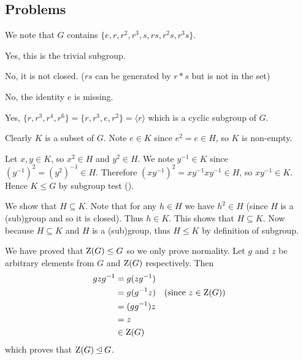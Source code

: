 \subsection*{Problems}
\begin{questions}
    \item We note that $G$ contains $\{e, r, r^2, r^3, s, rs, r^2s, r^3s\}$.
    \begin{partquestions}{\alph*}
        \item Yes, this is the trivial subgroup.
        \item No, it is not closed. ($rs$ can be generated by $r \ast s$ but is not in the set)
        \item No, the identity $e$ is missing.
        \item Yes, $\{r, r^3, r^4, r^6\} = \{r, r^3, e, r^2\} = \langle r \rangle$ which is a cyclic subgroup of $G$.
    \end{partquestions}

    \item \begin{partquestions}{\alph*}
        \item Clearly $K$ is a subset of $G$. Note $e \in K$ since $e^2 = e \in H$, so $K$ is non-empty.

        Let $x, y \in K$, so $x^2 \in H$ and $y^2 \in H$. We note $y^{-1} \in K$ since $(y^{-1})^2 = (y^2)^{-1} \in H$. Therefore $(xy^{-1})^2 = xy^{-1}xy^{-1} \in H$, so $xy^{-1} \in K$. Hence $K \leq G$ by subgroup test ().

        \item We show that $H \subseteq K$. Note that for any $h \in H$ we have $h^2 \in H$ (since $H$ is a (sub)group and so it is closed). Thus $h \in K$. This shows that $H \subseteq K$. Now because $H \subseteq K$ and $H$ is a (sub)group, thus $H \leq K$ by definition of subgroup.
    \end{partquestions}

    \item \begin{partquestions}{\alph*}
        \item We have proved that $\mathrm{Z}(G) \leq G$ so we only prove normality. Let $g$ and $z$ be arbitrary elements from $G$ and $\mathrm{Z}(G)$ respectively. Then
        \begin{align*}
            gzg^{-1} &= g(zg^{-1})\\
            &= g(g^{-1}z) & (\text{since }z \in \mathrm{Z}(G))\\
            &= (gg^{-1})z \\
            &= z\\
            &\in \mathrm{Z}(G)
        \end{align*}
        which proves that $\mathrm{Z}(G) \unlhd G$.


\end{partquestions}
\end{questions}
